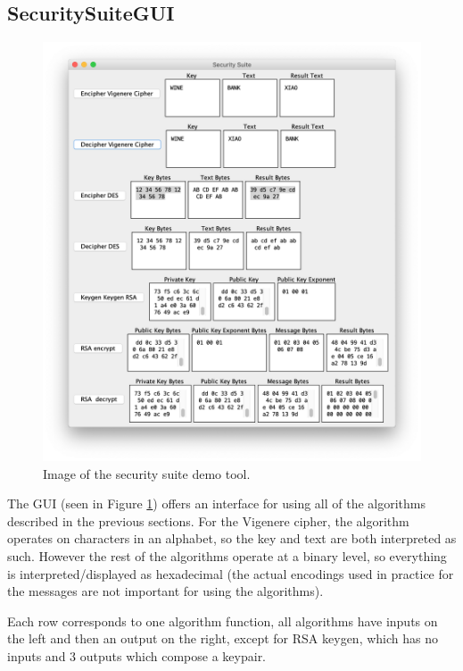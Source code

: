 \documentclass[acmlarge]{acmart}
\begin{document}
\subsection{SecuritySuiteGUI}\label{sec:gui}

\begin{figure}
  \centering
  \includegraphics[scale=0.40]{demo}
  \caption{Image of the security suite demo tool.}
  \label{fig:one}
\end{figure}

The GUI (seen in Figure \ref{fig:one}) offers an interface for using all of the algorithms described in the previous sections. For the Vigenere cipher, the algorithm operates on characters in an alphabet, so the key and text are both interpreted as such. However the rest of the algorithms operate at a binary level, so everything is interpreted/displayed as hexadecimal (the actual encodings used in practice for the messages are not important for using the algorithms).

Each row corresponds to one algorithm function, all algorithms have inputs on the left and then an output on the right, except for RSA keygen, which has no inputs and 3 outputs which compose a keypair.
\end{document}
